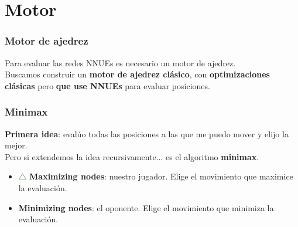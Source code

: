 
\section{Motor}

\begin{frame}
\frametitle{Motor de ajedrez}
Para evaluar las redes NNUEs es necesario un motor de ajedrez. \pause \\
\vspace{1em}
Buscamos construir un \textbf{motor de ajedrez clásico}, con \textbf{optimizaciones clásicas} pero \textbf{que use NNUEs} para evaluar posiciones.
\end{frame}

\begin{frame}
\frametitle{Minimax}
\textbf{Primera idea}: evalúo todas las posiciones a las que me puedo mover y elijo la mejor. \\
\vspace{1em}
\pause
Pero si extendemos la idea recursivamente... es el algoritmo \textbf{minimax}.
\begin{itemize}
\item \textcolor{ForestGreen}{$\triangle$} \textbf{Maximizing nodes}: nuestro jugador. Elige el movimiento que maximice la evaluación.
\item \textcolor{red}{} \textbf{Minimizing nodes}: el oponente. Elige el movimiento que minimiza la evaluación.
\end{itemize}
\end{frame}

